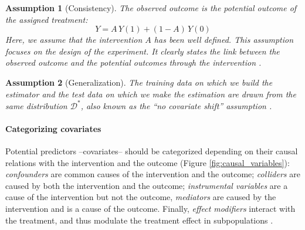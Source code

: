 \documentclass[french,12pt,twoside,a4paper]{book}
\newtheorem{assumption}{Assumption}
\begin{document}
\begin{background_box_left}
  \begin{assumption}[Consistency]\label{assumption:consistency} The observed
    outcome is the potential outcome of the assigned treatment:
    \begin{equation*}\label{eq:consistancy}
      Y = A \, Y(1) + (1-A) \, Y(0)
    \end{equation*}
    Here, we assume that the intervention $A$ has been well defined. This
    assumption focuses on the design of the experiment. It clearly states the link
    between the observed outcome and the potential outcomes through the
    intervention \citep{hernan_causal_2020}.
  \end{assumption}

  \begin{assumption}[Generalization]\label{assumption:generalization} The training
    data on which we build the estimator and the test data on which we make the
    estimation are drawn from the same distribution $\mathcal D^*$, also known as
    the ``no covariate shift'' assumption \citep{jesson_identifying_2020}.
  \end{assumption}


  \paragraph{Categorizing covariates}
  Potential predictors --covariates-- should be categorized depending on their
  causal relations with the intervention and the outcome (Figure
  \ref{fig:causal_variables}): \emph{confounders} are common causes of the
  intervention and the outcome; \emph{colliders} are caused by both the
  intervention and the outcome; \emph{instrumental variables} are a cause of the
  intervention but not the outcome, \emph{mediators} are caused by the
  intervention and is a cause of the outcome. Finally, \emph{effect modifiers}
  interact with the treatment, and thus
  modulate the treatment effect in subpopulations \citep{attia2022proposal}.

\end{background_box_left}
\end{document}

